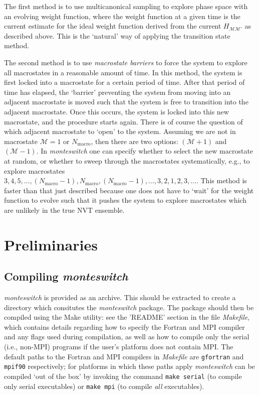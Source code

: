 \documentclass{report}
\begin{document}
The first method is to use multicanonical sampling to explore phase space with an evolving weight function, where the weight function
at a given time is the current estimate for the ideal weight function derived from the current $H_{\mathcal{M}\mathcal{M}'}$ as described above.
This is the `natural' way of applying the transition state method.

The second method is to use \emph{macrostate barriers} to force the system to explore all macrostates in a reasonable amount of time. In this
method, the system is first locked into a macrostate for a certain period of time. After that period of time has elapsed, the `barrier' preventing
the system from moving into an adjacent macrostate is moved such that the system is free to transition into the adjacent macrostate. Once this occurs,
the system is locked into this new macrostate, and the procedure starts again. There is of course the question of which adjacent macrostate to `open'
to the system. Assuming we are not in macrostate $\mathcal{M}=1$ or $N_{\text{macro}}$, then there are two options: $(\mathcal{M}+1)$ and $(\mathcal{M}-1)$.
In \emph{monteswitch} one can specify whether to select the new macrostate at random, or whether to sweep through the macrostates systematically, e.g.,
to explore macrostates $3,4,5,\dotsc,(N_{\text{macro}}-1),N_{\text{macro}},(N_{\text{macro}}-1),\dotsc,3,2,1,2,3,\dotsc$. This method is faster than that
just described because one does not have to `wait' for the weight function to evolve such that it pushes the system to explore macrostates which
are unlikely in the true NVT ensemble.


\chapter{Preliminaries}\label{chapter:preliminaries}

\section{Compiling \emph{monteswitch}}
\emph{monteswitch} is provided as an archive. This should be extracted to create a directory which consitutes the \emph{monteswitch} package. The 
package should then be compiled using the Make utility: see the 'README' section in the file \emph{Makefile}, which contains details regarding how to
specify the Fortran and MPI compiler and any flags used during compilation, as well as how to compile only the serial (i.e., non-MPI) programs
if the user's platform does not contain MPI.
The default paths to the Fortran and MPI compilers in \emph{Makefile} are \texttt{gfortran} and \texttt{mpif90} respectively; for platforms in which
these paths apply \emph{monteswitch} can be compiled `out of the box' by invoking the command \texttt{make serial} (to compile only serial executables)
or \texttt{make mpi} (to compile \emph{all} executables).
\end{document}

